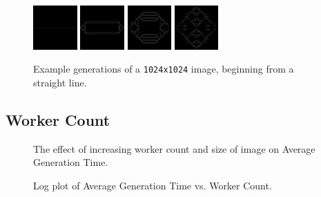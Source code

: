 \documentclass{article}
\begin{document}
    \begin{figure}[h]
        \begin{center}
            \includegraphics[width=0.15\textwidth]{test1024.png}
            \includegraphics[width=0.15\textwidth]{testout1024-1.png}
            \includegraphics[width=0.15\textwidth]{testout1024-2.png}
            \includegraphics[width=0.15\textwidth]{testout1024-3.png}
            \caption{Example generations of a \texttt{1024x1024} image, beginning from a straight line.}
            \label{fig:test1024}
        \end{center}
    \end{figure}
    
    \subsection{Worker Count} \label{workercount}

    \begin{figure}[h]
        \begin{center}
            
            \caption{The effect of increasing worker count and size of image on Average Generation Time.}
            \label{fig:agt}
        \end{center}
    \end{figure}

    \begin{figure}[h]
        \begin{center}
            
            \caption{Log plot of Average Generation Time vs. Worker Count.}
            \label{fig:agtplot}
        \end{center}
    \end{figure}
\end{document}

